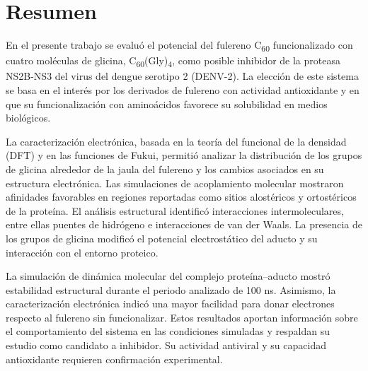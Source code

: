 \chapter{Resumen}
En el presente trabajo se evaluó el potencial del fulereno C\textsubscript{60} funcionalizado con cuatro moléculas de glicina, C\textsubscript{60}(Gly)\textsubscript{4}, como posible inhibidor de la proteasa NS2B-NS3 del virus del dengue serotipo 2 (DENV-2). La elección de este sistema se basa en el interés por los derivados de fulereno con actividad antioxidante y en que su funcionalización con aminoácidos favorece su solubilidad en medios biológicos.

La caracterización electrónica, basada en la teoría del funcional de la densidad (DFT) y en las funciones de Fukui, permitió analizar la distribución de los grupos de glicina alrededor de la jaula del fulereno y los cambios asociados en su estructura electrónica. Las simulaciones de acoplamiento molecular mostraron afinidades favorables en regiones reportadas como sitios alostéricos y ortostéricos de la proteína. El análisis estructural identificó interacciones intermoleculares, entre ellas puentes de hidrógeno e interacciones de van der Waals. La presencia de los grupos de glicina modificó el potencial electrostático del aducto y su interacción con el entorno proteico.

La simulación de dinámica molecular del complejo proteína--aducto mostró estabilidad estructural durante el periodo analizado de 100 ns. Asimismo, la caracterización electrónica indicó una mayor facilidad para donar electrones respecto al fulereno sin funcionalizar. Estos resultados aportan información sobre el comportamiento del sistema en las condiciones simuladas y respaldan su estudio como candidato a inhibidor. Su actividad antiviral y su capacidad antioxidante requieren confirmación experimental.
